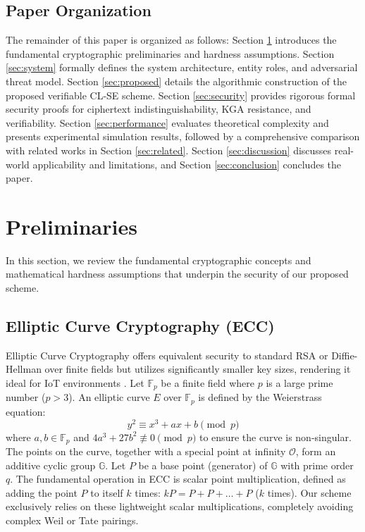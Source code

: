 \documentclass[10pt,journal,compsoc]{IEEEtran}
\begin{document}
\subsection{Paper Organization}
The remainder of this paper is organized as follows: Section \ref{sec:preliminaries} introduces the fundamental cryptographic preliminaries and hardness assumptions. Section \ref{sec:system} formally defines the system architecture, entity roles, and adversarial threat model. Section \ref{sec:proposed} details the algorithmic construction of the proposed verifiable CL-SE scheme. Section \ref{sec:security} provides rigorous formal security proofs for ciphertext indistinguishability, KGA resistance, and verifiability. Section \ref{sec:performance} evaluates theoretical complexity and presents experimental simulation results, followed by a comprehensive comparison with related works in Section \ref{sec:related}. Section \ref{sec:discussion} discusses real-world applicability and limitations, and Section \ref{sec:conclusion} concludes the paper.



\section{Preliminaries}\label{sec:preliminaries}
In this section, we review the fundamental cryptographic concepts and mathematical hardness assumptions that underpin the security of our proposed scheme.

\subsection{Elliptic Curve Cryptography (ECC)}
Elliptic Curve Cryptography offers equivalent security to standard RSA or Diffie-Hellman over finite fields but utilizes significantly smaller key sizes, rendering it ideal for IoT environments \cite{liu2023pairing}. 
Let $\mathbb{F}_p$ be a finite field where $p$ is a large prime number ($p > 3$). An elliptic curve $E$ over $\mathbb{F}_p$ is defined by the Weierstrass equation:
\begin{equation}
y^2 \equiv x^3 + ax + b \pmod p
\end{equation}
where $a, b \in \mathbb{F}_p$ and $4a^3 + 27b^2 \not\equiv 0 \pmod p$ to ensure the curve is non-singular. 
The points on the curve, together with a special point at infinity $\mathcal{O}$, form an additive cyclic group $\mathbb{G}$. Let $P$ be a base point (generator) of $\mathbb{G}$ with prime order $q$. The fundamental operation in ECC is scalar point multiplication, defined as adding the point $P$ to itself $k$ times: $kP = P + P + \dots + P$ ($k$ times). Our scheme exclusively relies on these lightweight scalar multiplications, completely avoiding complex Weil or Tate pairings.
\end{document}
